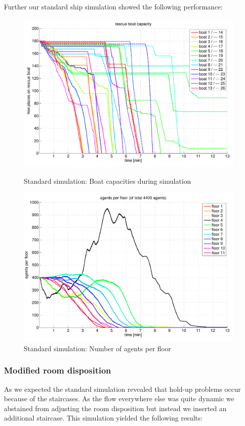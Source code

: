 \documentclass[11pt]{article}
\begin{document}
Further our standard ship simulation showed the following performance:

\begin{figure}[htbp]
\centering
{\begin{minipage}[t]{7.4cm}
\includegraphics[width=\textwidth]{run1-standard-rescueboatcapacity.pdf}
\caption{Standard simulation: Boat capacities during simulation}
\end{minipage}}
{\begin{minipage}[t]{7.4cm}
\includegraphics[width=\textwidth]{run1-standard-agentsperfloor.pdf}
\caption{Standard simulation: Number of agents per floor}
\end{minipage}}
\end{figure}

\subsubsection{Modified room disposition}
As we expected the standard simulation revealed that hold-up problems occur because of the staircases. As the flow everywhere else was quite dynamic we abstained from adjusting the room disposition but instead we inserted an additional staircase. This simulation yielded the following results:
\end{document}
